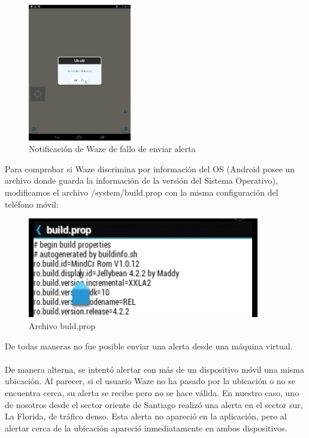         \begin{figure}[H]
  \begin{center}
    \includegraphics[width=0.4\textwidth]{imagenes/fig18.png}
    \caption{Notificación de Waze de fallo de enviar alerta}
  \end{center}
\end{figure}

Para comprobar si Waze discrimina por información del OS (Android posee un archivo donde guarda la información de la versión del Sistema Operativo), modificamos el archivo /system/build.prop con la misma configuración del teléfono móvil:

    
            \begin{figure}[H]
  \begin{center}
    \includegraphics[width=0.9\textwidth]{imagenes/fig19.png}
    \caption{Archivo buld.prop}
  \end{center}
\end{figure}
    
De todas maneras no fue posible enviar una alerta desde una máquina virtual.
\\\\
De manera alterna, se intentó alertar con más de un dispositivo móvil una misma ubicación. Al parecer, si el usuario Waze no ha pasado por la ubicación o no se encuentra cerca, su alerta se recibe pero no se hace válida. En nuestro caso, uno de nosotros desde el sector oriente de Santiago realizó una alerta en el sector sur, La Florida, de tráfico denso. Esta alerta no apareció en la aplicación, pero al alertar cerca de la ubicación apareció inmediatamente en ambos dispositivos.
    
